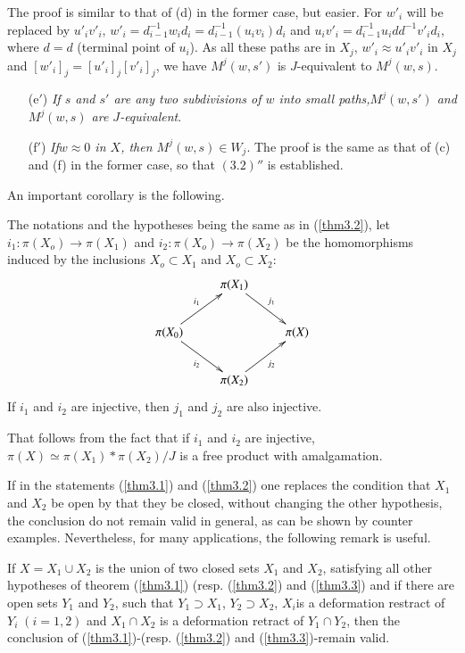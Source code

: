 The proof is similar to that of (d) in the former case, but
easier. For $w'_i$ will be replaced by $u'_i v'_i$, $w'_i =
d^{-1}_{i-1} w_i d_i =  d^{-1}_{i-1} (u_i v_i) d_i$ and $u_i v'_i =
d^{-1}_{i -1} u_i dd^{-1} v'_i d_i$, where $d=d$ (terminal point of
$u_i$). As all these paths are in $X_j$,  $w'_i \approx u'_i v'_i$ in
$X_j$ and $[w'_i]_j = [u'_i]_j [v'_i]_j$, we have $M^j(w,s')$ is
$J$-equivalent to $M^j(w,s)$. 

\begin{itemize}
\item[(e$'$)] \textit{If $s$ and $s'$ are any two subdivisions of $w$
  into small paths,\break $M^j(w,s')$ and  $M^j (w,s)$ are $J$-equivalent}. 

\item[(f$'$)] \textit{If\pageoriginale $w \approx 0$ in $X$, then
  $M^j(w,s) \in W_j$}. The proof is the same as that of (c) and
  (f) in the former case, so that $(3.2)''$ is established.  
\end{itemize}
  
  An important corollary is the following.
  
  \begin{theorem}\label{thm3.3}%
 The notations and the hypotheses being the same as in (\ref{thm3.2}),
  let $i_1 : \pi (X_o) \to \pi (X_1)$ and $i_2 :  \pi (X_o)  \to
  \pi (X_2)$ be the homomorphisms induced by the inclusions $X_o
  \subset X_1$ and $X_o \subset X_2$: 
\[
\xymatrix{
& \pi (X_1) \ar[dr]^{j_1} \\
\pi (X_0) \ar[ur]^{i_1} \ar[dr]_{i_2} & & \pi (X) \\
& \pi (X_2) \ar[ur]_{j_2} & 
}
\]
 If $i_1$ and $i_2$ are injective, then $j_1$ and $j_2$ are also injective.
  \end{theorem}  
  
That follows from the fact that if $i_1$ and $i_2$ are injective,
$\pi (X) \simeq \pi (X_1) \ast \pi (X_2) /J$ is a free product
with amalgamation. 
  
If in the statements (\ref{thm3.1}) and (\ref{thm3.2}) one replaces
the condition 
that $X_1$ and $X_2$ be open by that they be closed, without changing
the other hypothesis, the  conclusion do not remain valid in general,
as can be shown by counter examples. Nevertheless, for many
applications, the following remark is useful. 

\setcounter{remark}{3}
\begin{remark}\label{rem3.4} %
If $X =X_1 \cup X_2$ is the union of two closed sets $X_1$ and
 $X_2$, satisfying all other hypotheses of theorem (\ref{thm3.1}) (resp.
 (\ref{thm3.2}) and (\ref{thm3.3}) and if there are open sets $Y_1$
and $Y_2$, such 
 that $Y_1 \supset X_1$, $Y_2 \supset X_2$, $X_i$\pageoriginale is a
 deformation restract of $Y_i \; (i = 1,2)$ and $X_1 \cap X_2$ is a
 deformation retract of $Y_1 \cap Y_2$, then the conclusion of 
 (\ref{thm3.1})-(resp. (\ref{thm3.2}) and (\ref{thm3.3})-remain valid. 
\end{remark}   
   
